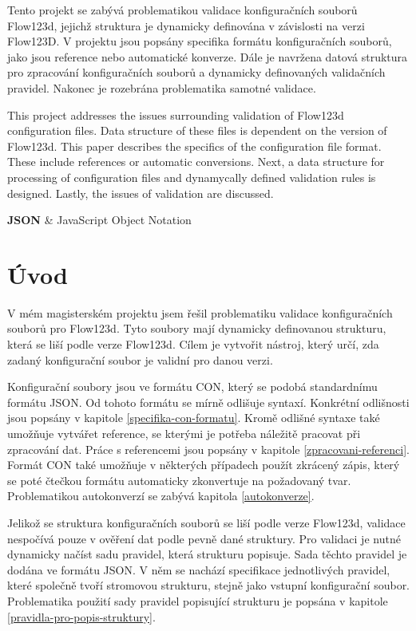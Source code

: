 \documentclass[FM,MP]{tulthesis}
\begin{document}

\begin{abstractCZ}
	Tento projekt se zabývá problematikou validace konfiguračních souborů Flow123d, jejichž struktura je dynamicky definována v závislosti na verzi Flow123D. V projektu jsou popsány specifika formátu konfiguračních souborů, jako jsou reference nebo automatické konverze. Dále je navržena datová struktura pro zpracování konfiguračních souborů a dynamicky definovaných validačních pravidel. Nakonec je rozebrána problematika samotné validace. 
\end{abstractCZ}
\vspace{2cm}
\begin{abstractEN}
	This project addresses the issues surrounding validation of Flow123d configuration files. Data structure of these files is dependent on the version of Flow123d. This paper describes the specifics of the configuration file format. These include references or automatic conversions. Next, a data structure for processing of configuration files and dynamycally defined validation rules is designed. Lastly, the issues of validation are discussed.
\end{abstractEN}

\tableofcontents
\clearpage

\begin{abbrList}
\textbf{JSON} & JavaScript Object Notation \\
\end{abbrList}

\chapter{Úvod}
	V mém magisterském projektu jsem řešil problematiku validace konfiguračních souborů pro Flow123d. Tyto soubory mají dynamicky definovanou strukturu, která se liší podle verze Flow123d. Cílem je vytvořit nástroj, který určí, zda zadaný konfigurační soubor je validní pro danou verzi.

	Konfigurační soubory jsou ve formátu CON, který se podobá standardnímu formátu JSON. Od tohoto formátu se mírně odlišuje syntaxí. Konkrétní odlišnosti jsou popsány v kapitole \ref{specifika-con-formatu}. Kromě odlišné syntaxe také umožňuje vytvářet reference, se kterými je potřeba náležitě pracovat při zpracování dat. Práce s referencemi jsou popsány v kapitole \ref{zpracovani-referenci}. Formát CON také umožňuje v některých případech použít zkrácený zápis, který se poté čtečkou formátu automaticky zkonvertuje na požadovaný tvar. Problematikou autokonverzí se zabývá kapitola \ref{autokonverze}.

	Jelikož se struktura konfiguračních souborů se liší podle verze Flow123d, validace nespočívá pouze v ověření dat podle pevně dané struktury. Pro validaci je nutné dynamicky načíst sadu pravidel, která strukturu popisuje. Sada těchto pravidel je dodána ve formátu JSON. V něm se nachází specifikace jednotlivých pravidel, které společně tvoří stromovou strukturu, stejně jako vstupní konfigurační soubor. Problematika použití sady pravidel popisující strukturu je popsána v kapitole \ref{pravidla-pro-popis-struktury}.
\end{document}
